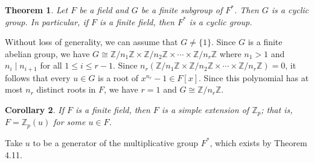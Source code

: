 \documentclass[10pt]{article}
\makeatletter
\newcommand{\Z}{\mathbb{Z}}
\theoremstyle{newstyle}
\newtheorem{thm}{Theorem}[section]
\newtheorem{cor}[thm]{Corollary}
\newenvironment{pf}[1][\proofname]{\par
  \pushQED{\qed}%
  \normalfont \topsep0\p@\relax
  \trivlist
  \item[\hskip\labelsep\scshape
  #1\@addpunct{.}]\ignorespaces
}{%
  \popQED\endtrivlist\@endpefalse
}
\makeatother
\begin{document}
\begin{thm}
Let $F$ be a field and $G$ be a finite subgroup of $F^*$. Then $G$ is a cyclic group. 
In particular, if $F$ is a finite field, then $F^*$ is a cyclic group. 
\end{thm}
\begin{pf}
Without loss of generality, we can assume that $G \neq \{1\}$. Since $G$ is a 
finite abelian group, we have $G \cong \Z/n_1\Z \times \Z/n_2\Z \times \cdots \times 
\Z/n_r\Z$ where $n_1 > 1$ and $n_i \mid n_{i+1}$ for all $1 \leq i \leq r-1$. 
Since $n_r(\Z/n_1\Z \times \Z/n_2\Z \times \cdots \times \Z/n_r\Z) = 0$, it follows 
that every $u \in G$ is a root of $x^{n_r} - 1 \in F[x]$. Since this polynomial 
has at most $n_r$ distinct roots in $F$, we have $r = 1$ and $G \cong \Z/n_r\Z$.
\end{pf}

\begin{cor}
If $F$ is a finite field, then $F$ is a simple extension of $\Z_p$; that is, 
$F= \Z_p(u)$ for some $u \in F$.
\end{cor}
\begin{pf}
Take $u$ to be a generator of the multiplicative group $F^*$, which exists by Theorem 4.11.
\end{pf}
\end{document}
